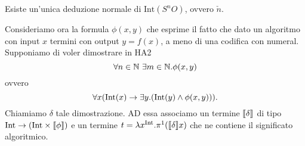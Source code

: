 \documentclass[]{marticle}
\begin{document}
\begin{block}[Lemma]
    Esiste un'unica deduzione normale di $\text{Int} (S^nO)$, ovvero
    $\check{n}$.
\end{block}

Consideriamo ora la formula $\phi(x,y)$ che esprime il fatto che dato un
algoritmo con input $x$ termini con output $y=f(x)$, a meno di una codifica con
numeral. Supponiamo di voler dimostrare in HA2
\[
    \forall n\in\mathbb{N}\ \exists m\in\mathbb{N} . \phi(x,y)
\]
ovvero
\[
    \forall x (\text{Int}(x)\rightarrow \exists y. (\text{Int}(y)\land \phi(x,y))).
\]
Chiamiamo $\delta$ tale dimostrazione. AD essa associamo un termine
$\llbracket \delta \rrbracket$ di tipo $\text{Int}\rightarrow (\text{Int}\times\llbracket \phi \rrbracket)$ e un termine $t = \lambda
x^{\text{Int}}.\pi^1(\llbracket \delta \rrbracket x)$ che ne contiene il significato algoritmico.
\end{document}
